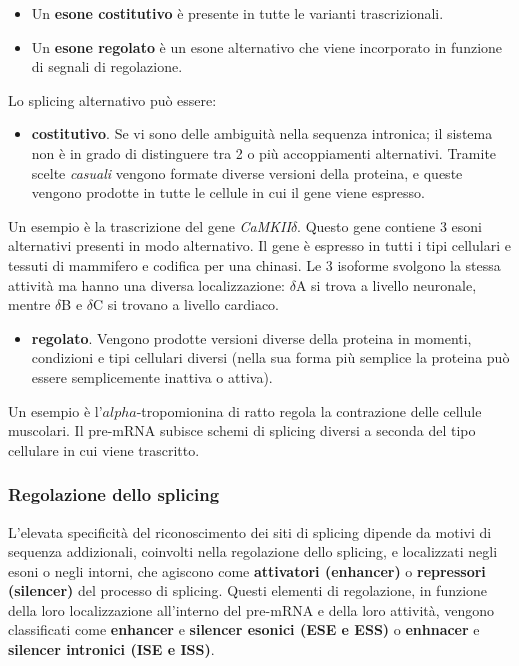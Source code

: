 \documentclass[]{article}
\begin{document}
\begin{itemize}
\item
  Un \textbf{esone costitutivo} è presente in tutte le varianti
  trascrizionali.
\item
  Un \textbf{esone regolato} è un esone alternativo che viene
  incorporato in funzione di segnali di regolazione.
\end{itemize}

Lo splicing alternativo può essere:

\begin{itemize}
\itemsep1pt\parskip0pt
\item
  \textbf{costitutivo}. Se vi sono delle ambiguità nella sequenza
  intronica; il sistema non è in grado di distinguere tra 2 o più
  accoppiamenti alternativi. Tramite scelte \emph{casuali} vengono
  formate diverse versioni della proteina, e queste vengono prodotte in
  tutte le cellule in cui il gene viene espresso.
\end{itemize}

Un esempio è la trascrizione del gene \emph{CaMKII\(\delta\)}. Questo
gene contiene 3 esoni alternativi presenti in modo alternativo. Il gene
è espresso in tutti i tipi cellulari e tessuti di mammifero e codifica
per una chinasi. Le 3 isoforme svolgono la stessa attività ma hanno una
diversa localizzazione: \(\delta\)A si trova a livello neuronale, mentre
\(\delta\)B e \(\delta\)C si trovano a livello cardiaco.

\begin{itemize}
\itemsep1pt\parskip0pt
\item
  \textbf{regolato}. Vengono prodotte versioni diverse della proteina in
  momenti, condizioni e tipi cellulari diversi (nella sua forma più
  semplice la proteina può essere semplicemente inattiva o attiva).
\end{itemize}

Un esempio è l'\(alpha\)-tropomionina di ratto regola la contrazione
delle cellule muscolari. Il pre-mRNA subisce schemi di splicing diversi
a seconda del tipo cellulare in cui viene trascritto.

\subsubsection{Regolazione dello
splicing}\label{regolazione-dello-splicing}

L'elevata specificità del riconoscimento dei siti di splicing dipende da
motivi di sequenza addizionali, coinvolti nella regolazione dello
splicing, e localizzati negli esoni o negli intorni, che agiscono come
\textbf{attivatori (enhancer)} o \textbf{repressori (silencer)} del
processo di splicing. Questi elementi di regolazione, in funzione della
loro localizzazione all'interno del pre-mRNA e della loro attività,
vengono classificati come \textbf{enhancer} e \textbf{silencer esonici
(ESE e ESS)} o \textbf{enhnacer} e \textbf{silencer intronici (ISE e
ISS)}.
\end{document}
